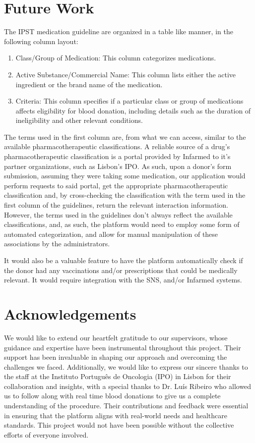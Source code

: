 \section{Future Work}
The IPST medication guideline are organized in a table like manner, in the following column layout:
\begin{enumerate}
	\item Class/Group of Medication: This column categorizes medications.
	\item Active Substance/Commercial Name: This column lists either the active ingredient or the brand name of the medication.
	\item Criteria: This column specifies if a particular class or group of medications affects eligibility for blood donation, including details such as the duration of ineligibility and other relevant conditions.
\end{enumerate}
The terms used in the first column are, from what we can access, similar to the available pharmacotherapeutic classifications. A reliable source of a drug's pharmacotherapeutic classification is a portal provided by Infarmed\cite{CITS} to it's partner organizations, such as Lisbon's IPO.
As such, upon a donor's form submission, assuming they were taking some medication, our application would perform requests to said portal, get the appropriate pharmacotherapeutic classification and, by cross-checking the classification with the term used in the first column of the guidelines, return the relevant interaction information.
However, the terms used in the guidelines don't always reflect the available classifications, and, as such, the platform would need to employ some form of automated categorization, and allow for manual manipulation of these associations by the administrators.

It would also be a valuable feature to have the platform automatically check if the donor had any vaccinations and/or prescriptions that could be medically relevant. It would require integration with the SNS, and/or Infarmed systems.

\section{Acknowledgements}

We would like to extend our heartfelt gratitude to our supervisors, whose guidance and expertise have been instrumental throughout this project. Their support has been invaluable in shaping our approach and overcoming the challenges we faced. Additionally, we would like to express our sincere thanks to the staff at the Instituto Português de Oncologia (IPO) in Lisbon for their collaboration and insights, with a special thanks to Dr. Luís Ribeiro who allowed us to follow along with real time blood donations to give us a complete understanding of the procedure. Their contributions and feedback were essential in ensuring that the platform aligns with real-world needs and healthcare standards. This project would not have been possible without the collective efforts of everyone involved.